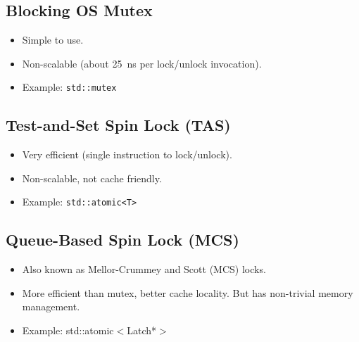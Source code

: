 \documentclass[11pt]{article}
\begin{document}
\subsection*{Blocking OS Mutex}
\begin{itemize}
    \item
    Simple to use.
    
    \item
    Non-scalable (about 25~ns per lock/unlock invocation).
    
    \item Example: \texttt{std::mutex}
\end{itemize}

\subsection*{Test-and-Set Spin Lock (TAS)}
\begin{itemize}
    \item
    Very efficient (single instruction to lock/unlock).
    
    \item
    Non-scalable, not cache friendly.
    
    \item Example: \texttt{std::atomic<T>}
\end{itemize}

\subsection*{Queue-Based Spin Lock (MCS)}
\begin{itemize}
    \item
    Also known as Mellor-Crummey and Scott (MCS) locks.
    
    \item
    More efficient than mutex, better cache locality.
    But has non-trivial memory management.
    
    \item Example: std::atomic$<$Latch*$>$
\end{itemize}

\end{document}
